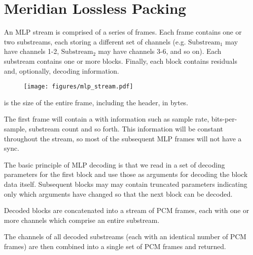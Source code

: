 

\section{Meridian Lossless Packing}

An MLP stream is comprised of a series of frames.
Each frame contains one or two substreams, each storing a different
set of channels (e.g. $\text{Substream}_1$ may have channels 1-2,
$\text{Substream}_2$ may have channels 3-6, and so on).
Each substream contains one or more blocks.
Finally, each block contains  residuals
and, optionally, decoding information.
\begin{figure}[h]
\texttt{[image: figures/mlp\_stream.pdf]}
\end{figure}
\par
\noindent
{} is the size of the entire frame,
including the header, in bytes.
\par
The first frame will contain a  with information
such as sample rate, bits-per-sample, substream count and so forth.
This information will be constant throughout the stream,
so most of the subsequent MLP frames will not have a sync.

The basic principle of MLP decoding is that we read in a
set of decoding parameters for the first block and use those
as arguments for decoding the block data itself.
Subsequent blocks may may contain truncated parameters
indicating only which arguments have changed so that the
next block can be decoded.

Decoded blocks are concatenated into a stream of PCM frames,
each with one or more channels which comprise an entire substream.

The channels of all decoded substreams
(each with an identical number of PCM frames) are then combined
into a single set of PCM frames and returned.

\clearpage

